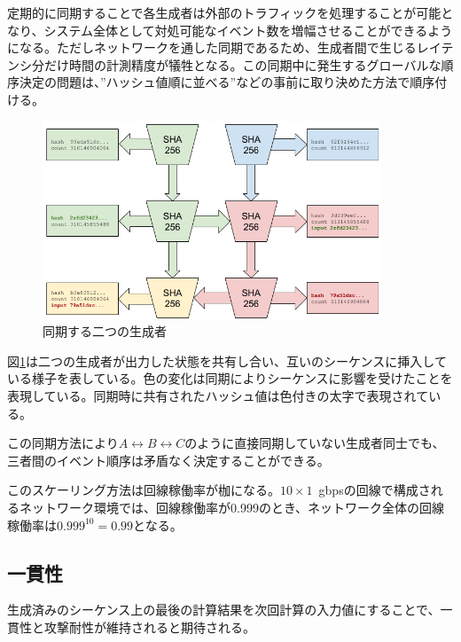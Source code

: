 \documentclass[12pt]{ltjsarticle}
\begin{document}
定期的に同期することで各生成者は外部のトラフィックを処理することが可能となり、システム全体として対処可能なイベント数を増幅させることができるようになる。ただしネットワークを通した同期であるため、生成者間で生じるレイテンシ分だけ時間の計測精度が犠牲となる。この同期中に発生するグローバルな順序決定の問題は、”ハッシュ値順に並べる”などの事前に取り決めた方法で順序付ける。

\begin{figure}
  \begin{center}
    \centering
    \includegraphics[width=0.9\textwidth]{../../figures/fig_5.png}
    \caption[Fig 5]{同期する二つの生成者\label{fig:poh_scale}}
  \end{center}
  \end{figure}

図\ref{fig:poh_scale}は二つの生成者が出力した状態を共有し合い、互いのシーケンスに挿入している様子を表している。色の変化は同期によりシーケンスに影響を受けたことを表現している。同期時に共有されたハッシュ値は色付きの太字で表現されている。

この同期方法により\(A \leftrightarrow B \leftrightarrow C\)のように直接同期していない生成者同士でも、三者間のイベント順序は矛盾なく決定することができる。

このスケーリング方法は回線稼働率が枷になる。$10 \times 1$~gbpsの回線で構成されるネットワーク環境では、回線稼働率が0.999のとき、ネットワーク全体の回線稼働率は\(0.999^{10} = 0.99 \)となる。

\subsection{一貫性}
生成済みのシーケンス上の最後の計算結果を次回計算の入力値にすることで、一貫性と攻撃耐性が維持されると期待される。\\
\end{document}

